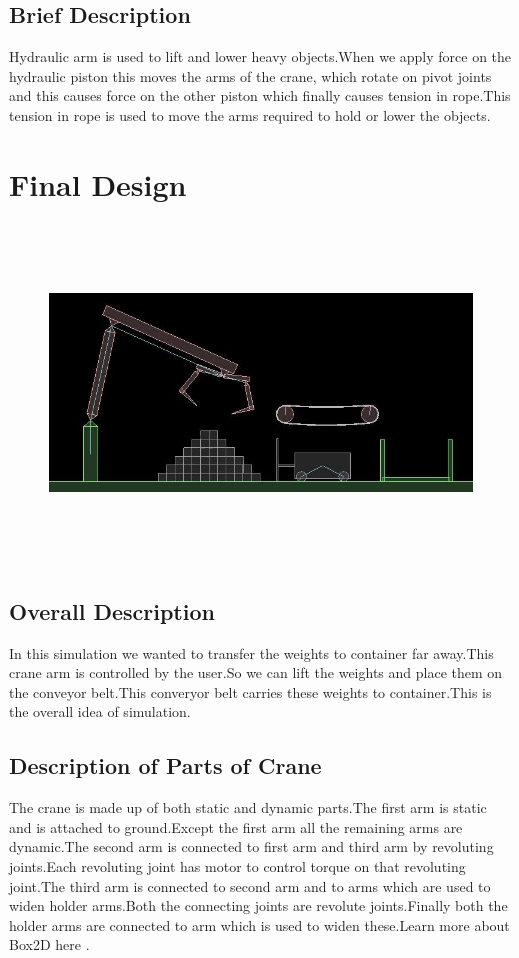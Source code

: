 \documentclass[11pt]{article}
\begin{document}
\subsection{Brief Description}
Hydraulic arm is used to lift and lower heavy objects.When we apply force on the hydraulic piston this moves the arms of the crane, which rotate on pivot joints and this causes force on the other piston which finally causes tension in rope.This tension in rope is used to move the arms required to hold or lower the objects.
\section{Final Design}

\begin{figure}[ht!]
\centering
\includegraphics[height=9cm]{final.jpg}
\end{figure}

\subsection{Overall Description}
In this simulation we wanted to transfer the weights to container far away.This crane arm is controlled by the user.So we can lift the weights and place them on the conveyor belt.This converyor belt carries these weights to container.This is the overall idea of simulation.
\subsection{Description of Parts of Crane}
The crane is made up of both static and dynamic parts.The first arm is static and is attached to ground.Except the first arm all the remaining arms are dynamic.The second arm is connected to first arm and third arm by revoluting joints.Each revoluting joint has motor to control torque on that revoluting joint.The third arm is connected to second arm and to arms which are used to widen holder arms.Both the connecting joints are revolute joints.Finally both the holder arms are connected to arm which is used to widen these.Learn more about Box2D here 
\cite{iforce}.
\end{document}
